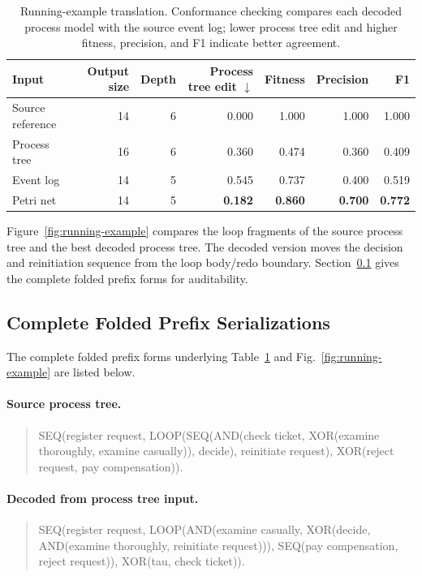 \documentclass[applsci,supfile,submit,pdftex,moreauthors]{Definitions/mdpi}
\newcommand{\best}[1]{\textbf{#1}}
\begin{document}
\begin{table}[H]
\centering
\caption{Running-example translation. Conformance checking compares each decoded process model with the source event log; lower process tree edit and higher fitness, precision, and F1 indicate better agreement.}
\label{tab:running}
\setlength{\tabcolsep}{4pt}
\begin{tabular}{@{}lrrrrrr@{}}
\toprule
Input & Output size & Depth & Process tree edit $\downarrow$ & Fitness & Precision & F1 \\
\midrule
Source reference & 14 & 6 & 0.000 & 1.000 & 1.000 & 1.000 \\
Process tree & 16 & 6 & 0.360 & 0.474 & 0.360 & 0.409 \\
Event log & 14 & 5 & 0.545 & 0.737 & 0.400 & 0.519 \\
Petri net & 14 & 5 & \best{0.182} & \best{0.860} & \best{0.700} & \best{0.772} \\
\bottomrule
\end{tabular}
\end{table}

Figure~\ref{fig:running-example} compares the loop fragments of the source process tree and the best decoded process tree. The decoded version moves the decision and reinitiation sequence from the loop body/redo boundary. Section~\ref{app:serialized-example} gives the complete folded prefix forms for auditability.



\FloatBarrier

\subsection{Complete Folded Prefix Serializations}\label{app:serialized-example}

The complete folded prefix forms underlying Table~\ref{tab:running} and Fig.~\ref{fig:running-example} are listed below.

\paragraph{Source process tree.}
\begin{quote}\ttfamily\small\raggedright
SEQ(register request, LOOP(SEQ(AND(check ticket,
XOR(examine thoroughly, examine casually)), decide),
reinitiate request), XOR(reject request, pay compensation)).
\end{quote}

\paragraph{Decoded from process tree input.}
\begin{quote}\ttfamily\small\raggedright
SEQ(register request, LOOP(AND(examine casually,
XOR(decide, AND(examine thoroughly, reinitiate request))),
SEQ(pay compensation, reject request)), XOR(tau, check ticket)).
\end{quote}
\end{document}
